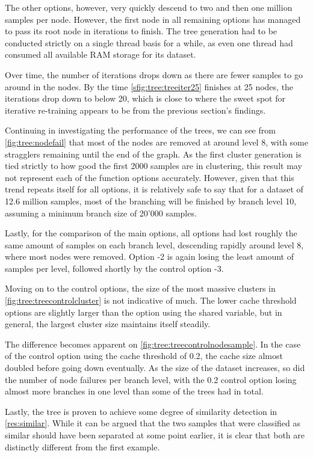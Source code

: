 The other options, however, very quickly descend to two and then one million samples per node.
However, the first node in all remaining options has managed to pass its root node in iterations to finish.
The tree generation had to be conducted strictly on a single thread basis for a while, as even one thread had consumed all available RAM storage for its dataset.

Over time, the number of iterations drops down as there are fewer samples to go around in the nodes.
By the time \cref{sfig:tree:treeiter25} finishes at 25 nodes, the iterations drop down to below 20, which is close to where the sweet spot for iterative re-training appears to be from the previous section's findings.

Continuing in investigating the performance of the trees, we can see from \cref{fig:tree:nodefail} that most of the nodes are removed at around level 8, with some stragglers remaining until the end of the graph.
As the first cluster generation is tied strictly to how good the first 2000 samples are in clustering, this result may not represent each of the function options accurately.
However, given that this trend repeats itself for all options, it is relatively safe to say that for a dataset of 12.6 million samples, most of the branching will be finished by branch level 10, assuming a minimum branch size of 20'000 samples.

Lastly, for the comparison of the main options, all options had lost roughly the same amount of samples on each branch level, descending rapidly around level 8, where most nodes were removed.
Option -2 is again losing the least amount of samples per level, followed shortly by the control option -3.

Moving on to the control options, the size of the most massive clusters in \cref{fig:tree:treecontrolcluster} is not indicative of much.
The lower cache threshold options are slightly larger than the option using the shared variable, but in general, the largest cluster size maintains itself steadily.

The difference becomes apparent on \cref{fig:tree:treecontrolnodesample}.
In the case of the control option using the cache threshold of 0.2, the cache size almost doubled before going down eventually.
As the size of the dataset increases, so did the number of node failures per branch level, with the 0.2 control option losing almost more branches in one level than some of the trees had in total.

Lastly, the tree is proven to achieve some degree of similarity detection in \cref{res:similar}.
While it can be argued that the two samples that were classified as similar should have been separated at some point earlier, it is clear that both are distinctly different from the first example.

